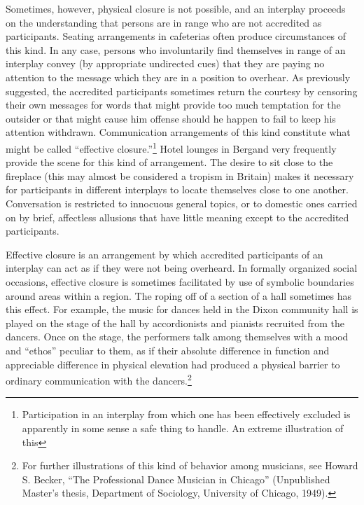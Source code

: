\documentclass[twoside,symmetric,nobib,justified]{tufte-book}
\begin{document}
Sometimes, however, physical closure is not possible, and an interplay
proceeds on the understanding that persons are in range who are not
accredited as participants. Seating arrangements in cafeterias often
produce circumstances of this kind. In any case, persons who
involuntarily find themselves in range of an interplay convey (by
appropriate undirected cues) that they are paying no attention to the
message which they are in a position to overhear. As previously
suggested, the accredited participants sometimes return the courtesy by
censoring their own messages for words that might provide too much
temptation for the outsider or that might cause him offense should he
happen to fail to keep his attention withdrawn. Communication
arrangements of this kind constitute what might be called ``effective
closure.''\footnote{Participation in an interplay from which one has
  been effectively excluded is apparently in some sense a safe thing to
  handle. An extreme illustration of this} Hotel lounges in Bergand very frequently provide the scene
for this kind of arrangement. The desire to sit close to the fireplace
(this may almost be considered a tropism in Britain) makes it necessary
for participants in different interplays to locate themselves close to
one another. Conversation is restricted to innocuous general topics, or
to domestic ones carried on by brief, affectless allusions that have
little meaning except to the accredited participants.

Effective closure is an arrangement by which accredited participants of
an interplay can act as if they were not being overheard. In formally
organized social occasions, effective closure is sometimes facilitated
by use of symbolic boundaries around areas within a region. The roping
off of a section of a hall sometimes has this effect. For example, the
music for dances held in the Dixon community hall is played on the stage
of the hall by accordionists and pianists recruited from the dancers.
Once on the stage, the performers talk among themselves with a mood and
``ethos'' peculiar to them, as if their absolute difference in function
and appreciable difference in physical elevation had produced a physical
barrier to ordinary communication with the dancers.\footnote{For
  further illustrations of this kind of behavior among musicians, see
  Howard S. Becker, ``The Professional Dance Musician in Chicago''
  (Unpublished Master's thesis, Department of Sociology, University of
  Chicago, 1949).}
\end{document}
